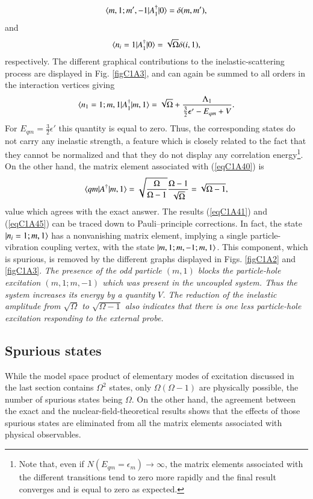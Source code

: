  \begin{align}\label{eqC1A42} 
\langle {m,1;m',-1|A_1^\dagger|0} \rangle=\delta(m,m'),
 \end{align}
and
 \begin{align}\label{eqC1A43} 
\langle {n_i=1|A_1^\dagger|0} \rangle=\sqrt{\Omega}\delta(i,1),
 \end{align}
respectively. The different graphical contributions to the inelastic-scattering
process are displayed in Fig. \ref{figC1A3}, and can again be summed to all orders in the
interaction vertices giving
 \begin{align}\label{eqC1A44} 
\langle {n_1=1;m,1|A_1^\dagger|m,1} \rangle=\sqrt{\Omega}+\frac{\Lambda_1}{\frac{3}{2}\epsilon'-E_{qm}+V}.
 \end{align}
For $E_{qm}=\frac{3}{2}\epsilon'$ this quantity is equal to zero. Thus, the corresponding states
do not carry any inelastic strength, a feature which is closely related to the
fact that they cannot be normalized and that they do not display any correlation energy\footnote{Note that, even if $N(E_{qm}=\epsilon_m)\rightarrow\infty$, the matrix elements associated with the different transitions tend to zero more rapidly and the final result converges and is equal
to zero as expected.}.
On the other hand, the matrix element associated with (\ref{eqC1A40}) is
 \begin{align}\label{eqC1A45} 
\langle {qm|A^\dagger|m,1} \rangle=\sqrt{\frac{\Omega}{\Omega-1}}\frac{\Omega-1}{\sqrt{\Omega}}=\sqrt{\Omega-1},
 \end{align}
value which agrees with the exact answer.
The results (\ref{eqC1A41}) and (\ref{eqC1A45}) can be traced down to Pauli--principle corrections. In fact, the state $|{n_i=1;m,1} \rangle$ has a nonvanishing matrix element,
implying a single particle-vibration coupling vertex, with the state $|{m,1;m,-1;m,1} \rangle$. This component, which is spurious, is removed by the different graphs displayed in Figs. \ref{figC1A2} and \ref{figC1A3}. \textit{The presence of the odd particle
$(m, 1)$ blocks the particle-hole excitation $(m,1; m,- 1)$ which was present in
the uncoupled system. Thus the system increases its energy by a quantity $V$.
The reduction of the inelastic amplitude from $\sqrt{\Omega}$ to $\sqrt{\Omega-1}$  also indicates
that there is one less particle-hole excitation responding to the external probe.}
\subsection{Spurious states}\label{C1S7sS3}
While the model space product of elementary modes of excitation discussed
in the last section contains $\Omega^2$ states, only $\Omega(\Omega-1)$ are physically possible,
the number of spurious states being $\Omega$.  On the other hand, the agreement
between the exact and the nuclear-field-theoretical results shows that the effects of those spurious states are eliminated from all the matrix elements associated with physical observables.


